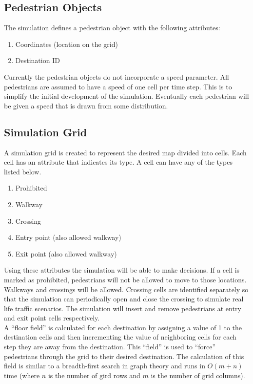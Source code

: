 \documentclass[paper=a4, fontsize=11pt]{scrartcl}
\numberwithin{equation}{section}		%
\numberwithin{figure}{section}			%
\numberwithin{table}{section}		    %
\begin{document}
	\subsection{Pedestrian Objects}
	The simulation defines a pedestrian object with the following attributes:
	\begin{enumerate}
		\item Coordinates (location on the grid)
		\item Destination ID
	\end{enumerate}
	
	\noindent
	Currently the pedestrian objects do not incorporate a speed parameter. All pedestrians are 
	assumed to have a speed of one cell per time step. This is to simplify the initial development 
	of the simulation. Eventually each pedestrian will be given a speed that is drawn from some 
	distribution.
	
	\subsection{Simulation Grid}
	A simulation grid is created to represent the desired map divided into cells. Each cell has an 
	attribute that indicates its type. A cell can have any of the types listed below.
	\begin{enumerate}
		\item Prohibited
		\item Walkway
		\item Crossing
		\item Entry point (also allowed walkway)
		\item Exit point (also allowed walkway)
	\end{enumerate}
	
	\noindent
	Using these attributes the simulation will be able to make decisions. If a cell is marked as 
	prohibited, pedestrians will not be allowed to move to those locations. Walkways and crossings 
	will be allowed. Crossing cells are identified separately so that the simulation can 
	periodically open and close the crossing to simulate real life traffic scenarios. The 
	simulation will insert and remove pedestrians at entry and exit point cells respectively.\\
	
	\noindent
	A ``floor field'' \cite{varas2007cellular} is calculated for each destination by assigning a 
	value of 1 to the destination cells and then incrementing the value of neighboring cells for 
	each step they are away from the destination. This ``field'' is used to ``force'' pedestrians 
	through the grid to their desired destination. The calculation of this field is similar to a 
	breadth-first search in graph theory and runs in $O(m+n)$ time (where $n$ is the number of gird 
	rows and $m$ is the number of grid columns). 
	
\end{document}
